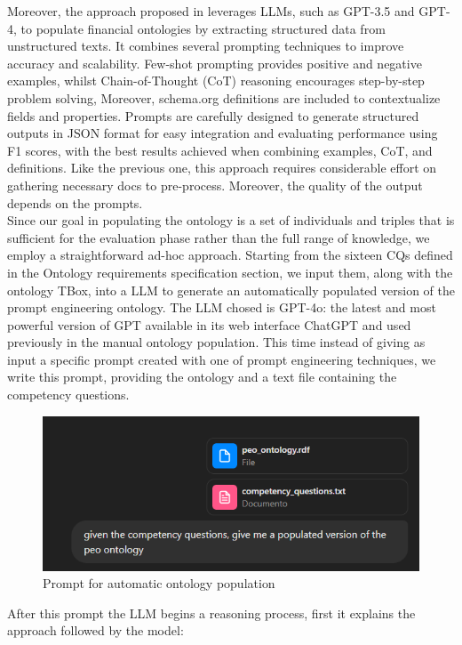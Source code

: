 Moreover, the approach proposed in \cite{saetia2024financial} leverages LLMs, such as GPT-3.5 and GPT-4, to populate financial ontologies by extracting structured data from unstructured texts.
It combines several prompting techniques to improve accuracy and scalability.
Few-shot prompting provides positive and negative examples, whilst Chain-of-Thought (CoT) reasoning encourages step-by-step problem solving,
Moreover, schema.org definitions are included to contextualize fields and properties.
Prompts are carefully designed to generate structured outputs in JSON format for easy integration and evaluating performance using F1 scores, with the best results achieved when combining examples, CoT, and definitions.
Like the previous one, this approach requires considerable effort on gathering necessary docs to pre-process.
Moreover, the quality of the output depends on the prompts.\\
Since our goal in populating the ontology is a set of individuals and triples that is sufficient for the evaluation phase rather than the full range of knowledge, we employ a straightforward ad-hoc approach.
Starting from the sixteen CQs defined in the Ontology requirements specification section, we input them, along with the ontology TBox, into a LLM to generate an automatically populated version of the prompt engineering ontology.
The LLM chosed is GPT-4o: the latest and most powerful version of GPT available in its web interface ChatGPT and used previously in the manual ontology population.
This time instead of giving as input a specific prompt created with one of prompt engineering techniques, we write this prompt, providing the ontology and a text file containing the competency questions.
\begin{figure}[H]
    \centering
    \includegraphics[width=0.9\linewidth]{Figures/fig_34.png}
    \caption{Prompt for automatic ontology population}
    \label{fig:34}
\end{figure}
After this prompt the LLM begins a reasoning process, first it explains the approach followed by the model:

